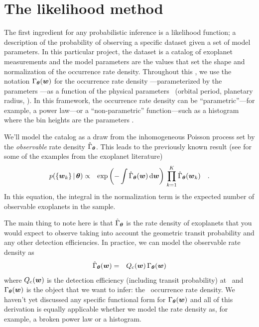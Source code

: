 \section{The likelihood method}

The first ingredient for any probabilistic inference is a likelihood function;
a description of the probability of observing a specific dataset given a set
of model parameters.
In this particular project, the dataset is a catalog of exoplanet measurements
and the model parameters are the values that set the shape and normalization
of the occurrence rate density.
Throughout this \paper, we use the notation $\Gamma_{{\boldsymbol{{\theta}}}}({{\boldsymbol{w}}})$ for the
occurrence rate density \rate---parameterized by the parameters \ratepars---as
a function of the physical parameters \entry\ (orbital period, planetary
radius, \etc).
In this framework, the occurrence rate density can be ``parametric''---for
example, a power law---or a ``non-parametric'' function---such as a histogram
where the bin heights are the parameters \ratepars.

We'll model the catalog as a draw from the inhomogeneous Poisson process set
by the \emph{observable} rate density $\hat{\Gamma}_{{\boldsymbol{{\theta}}}}$.
This leads to the previously known result (see \citealt{Tabachnik:2002,
Youdin:2011} for some of the examples from the exoplanet literature)
\begin{eqnarray}\eqlabel{poisson-like}
p(\{\entry_k\}\,|\,\ratepars) &\propto&
    \exp\left(-\int \obs{\rate}_\ratepars (\entry) \dd\entry\right) \,
    \prod_{k=1}^K \obs{\rate}_\ratepars (\entry_k)\quad.
\end{eqnarray}
In this equation, the integral in the normalization term is the expected
number of observable exoplanets in the sample.

The main thing to note here is that $\hat{\Gamma}_{{\boldsymbol{{\theta}}}}$ is the rate
density of exoplanets that you would expect to observe taking into account the
geometric transit probability and any other detection efficiencies.
In practice, we can model the observable rate density as
\begin{eqnarray}\eqlabel{obs-rate}
\obs{\rate}_\ratepars(\entry) &=&
    \completeness(\entry)\,\rate_\ratepars(\entry)
\end{eqnarray}
where ${Q_\mathrm{c}}({{\boldsymbol{w}}})$ is the detection efficiency (including transit
probability) at \entry\ and $\Gamma_{{\boldsymbol{{\theta}}}}({{\boldsymbol{w}}})$ is the object that we
want to infer: the \True\ occurrence rate density.
We haven't yet discussed any specific functional form for
$\Gamma_{{\boldsymbol{{\theta}}}}({{\boldsymbol{w}}})$ and all of this derivation is equally applicable
whether we model the rate density as, for example, a broken power law or a
histogram.

